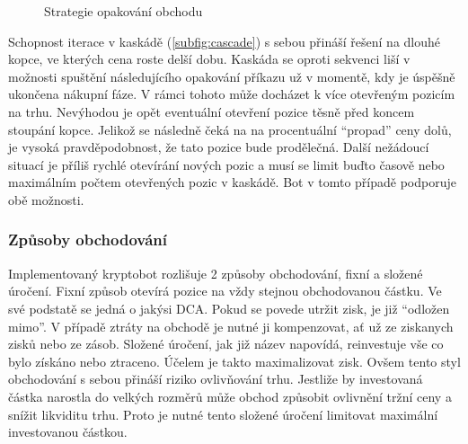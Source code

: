 \begin{figure}[ht]
    \centering
    \qquad
    \caption{Strategie opakování obchodu}
    \label{fig:trade-repeat}
\end{figure}

Schopnost iterace v kaskádě (\ref{subfig:cascade}) s sebou přináší řešení na dlouhé kopce, ve kterých cena roste delší dobu. Kaskáda se oproti sekvenci liší v možnosti spuštění následujícího opakování příkazu
už v momentě, kdy je úspěšně ukončena nákupní fáze. V rámci tohoto může docházet k více otevřeným pozicím na trhu. Nevýhodou je opět eventuální otevření pozice těsně před koncem stoupání
kopce. Jelikož se následně čeká na na procentuální \enquote{propad} ceny dolů, je vysoká pravděpodobnost, že tato pozice bude prodělečná. Další nežádoucí situací je příliš rychlé otevírání
nových pozic a musí se limit buďto časově nebo maximálním počtem otevřených pozic v kaskádě. Bot v tomto případě podporuje obě možnosti.

\subsubsection{Způsoby obchodování}
Implementovaný kryptobot rozlišuje 2 způsoby obchodování, fixní a složené úročení. Fixní způsob otevírá pozice na vždy stejnou obchodovanou částku. Ve své podstatě se jedná o jakýsi DCA. Pokud se
povede utržit zisk, je již \enquote{odložen mimo}. V případě ztráty na obchodě je nutné ji kompenzovat, ať už ze ziskanych zisků nebo ze zásob.
Složené úročení, jak již název napovídá, reinvestuje vše co bylo získáno nebo ztraceno. Účelem je takto maximalizovat zisk. Ovšem tento styl obchodování s sebou přináší riziko ovlivňování trhu. Jestliže
by investovaná částka narostla do velkých rozměrů může obchod způsobit ovlivnění tržní ceny a snížit likviditu trhu. Proto je nutné tento složené úročení limitovat maximální investovanou částkou.


